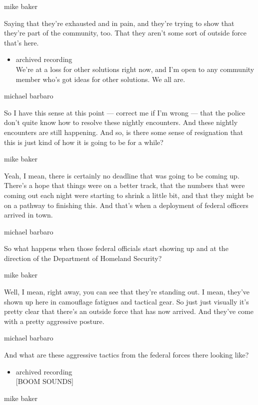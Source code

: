 mike baker

Saying that they're exhausted and in pain, and they're trying to show
that they're part of the community, too. That they aren't some sort of
outside force that's here.

\begin{itemize}
\tightlist
\item
  archived recording\\
  We're at a loss for other solutions right now, and I'm open to any
  community member who's got ideas for other solutions. We all are.
\end{itemize}

michael barbaro

So I have this sense at this point --- correct me if I'm wrong --- that
the police don't quite know how to resolve these nightly encounters. And
these nightly encounters are still happening. And so, is there some
sense of resignation that this is just kind of how it is going to be for
a while?

mike baker

Yeah, I mean, there is certainly no deadline that was going to be coming
up. There's a hope that things were on a better track, that the numbers
that were coming out each night were starting to shrink a little bit,
and that they might be on a pathway to finishing this. And that's when a
deployment of federal officers arrived in town.

michael barbaro

So what happens when those federal officials start showing up and at the
direction of the Department of Homeland Security?

mike baker

Well, I mean, right away, you can see that they're standing out. I mean,
they've shown up here in camouflage fatigues and tactical gear. So just
just visually it's pretty clear that there's an outside force that has
now arrived. And they've come with a pretty aggressive posture.

michael barbaro

And what are these aggressive tactics from the federal forces there
looking like?

\begin{itemize}
\tightlist
\item
  archived recording\\
  {[}BOOM SOUNDS{]}
\end{itemize}

mike baker

